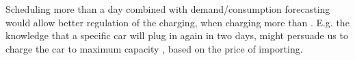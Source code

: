 Scheduling more than a day combined with demand\slash consumption forecasting would allow better regulation of the charging, when charging more than . E.g. the knowledge that a specific car will plug in again in two days, might persuade us to charge the car to maximum capacity , based on the price of importing.

